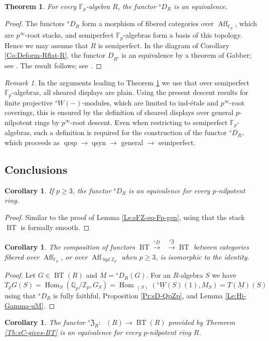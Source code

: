 \documentclass[a4paper,11pt]{amsart}
\theoremstyle{plain}
\newtheorem{Thm}[equation]{Theorem}
\newtheorem{Cor}[equation]{Corollary}
\theoremstyle{definition}
\theoremstyle{remark}
\newtheorem{Remark}[equation]{Remark}
\newcommand{\bTh}{\begin{Thm}}
\newcommand{\eTh}{\end{Thm}}
\newcommand{\bCo}{\begin{Cor}}
\newcommand{\eCo}{\end{Cor}}
\newcommand{\bRe}{\begin{Remark}}
\newcommand{\eRe}{\end{Remark}}
\newcommand{\bproof}{\begin{proof}}
\newcommand{\eproof}{\end{proof}}
\renewcommand{\u}{\underline}
\newcommand{\uM}{M} %
\numberwithin{equation}{section}
\newcommand{\FZ}{\mathfrak{Z}}
\newcommand{\FF}{{\mathbb{F}}}
\newcommand{\QQ}{{\mathbb{Q}}}
\newcommand{\ZZ}{{\mathbb{Z}}}
\DeclareMathOperator{\qrsp}{qrsp}
\DeclareMathOperator{\qsyn}{qsyn}
\DeclareMathOperator{\Aff}{Aff}
\DeclareMathOperator{\BT}{BT}
\DeclareMathOperator{\sDisp}{{}^sDisp}
\DeclareMathOperator{\Hom}{Hom}
\DeclareMathOperator{\Spf}{Spf}
\newcommand{\sD}{{}^{s\!}D}
\newcommand{\sFZ}{{}^s\FZ}
\newcommand{\sW}{{}^sW}
\newcommand{\usW}{{}^s\u W}
\begin{document}
\bTh
\label{Th:sD-equiv-Fp}
For every $\FF_p$-algebra $R$, the functor $\sD_R$ is an equivalence.
\eTh

\bproof
The functors $\sD_R$ form a morphism of fibered categories over $\Aff_{\FF_p}$, which are $p^\infty$-root stacks, and semiperfect $\FF_p$-algebras form a basis of this topology. Hence we may assume that $R$ is semiperfect.
In the diagram of Corollary \ref{Co:Deform-Rflat-R}, the functor $D_{R^\flat}$ is an equivalence by a theorem of Gabber; see \cite[Theorem D]{Lau:Smoothness}. The result follows; see \cite[Lemma 5.9]{Lau:Semiperf}.
\eproof

\bRe
In the arguments leading to Theorem \ref{Th:sD-equiv-Fp} we use that over semiperfect $\FF_p$-algebras, all sheared displays are plain. Using the present descent results for finite projective $\sW(-)$-modules, which are limited to ind-\'etale and $p^{\infty}$-root coverings, this is ensured by the definition of sheared displays over general $p$-nilpotent rings by $p^{\infty}$-root descent. Even when restricting to semiperfect $\FF_p$-algebras, such a definition is required for the construction of the functor $\sD_R$, which proceeds as $\qrsp\to\qsyn\to$ general $\to$ semiperfect.
\eRe

\subsection{Conclusions}
\label{Se:Dieud-equiv:conclusions}

\bCo
\label{Co:sD-equiv-3}
If $p\ge 3$, the functor $\sD_R$ is an equivalence for every $p$-nilpotent ring.
\eCo

\bproof
Similar to the proof of Lemma \ref{Le:sFZ-eq-Fp-gen}, using that the stack $\BT$ is formally smooth.
\eproof

\bCo
\label{Co:sD-sFZ}
The composition of functors $\BT\xrightarrow{\sD}\sDisp\xrightarrow{\sFZ}\BT$ between categories fibered over $\Aff_{\FF_p}$, or over $\Aff_{\Spf\ZZ_p}$ when $p\ge 3$, is isomorphic to the identity.
\eCo

\bproof
Let $G\in\BT(R)$ and $\uM=\sD_R(G)$. 
For an $R$-algebra $S$ we have
\[
T_pG(S)=\Hom_S(\QQ_p/\ZZ_p,G_S)=\Hom_{\sDisp(S)}(\usW(S)(1),\uM_S)=T(\u M)(S)
\] 
using that $\sD_R$ is fully faithful, Proposition \ref{Pr:sD-QpZp}, and Lemma \ref{Le:Hi-Gamma-uM}.
\eproof

\bCo
\label{Co:sFZ-equiv}
The functor $\sFZ_R\colon\sDisp(R)\to\BT(R)$ provided by Therorem \ref{Th:sC-gives-BT} is an equivalence for every $p$-nilpotent ring $R$.
\eCo
\end{document}
